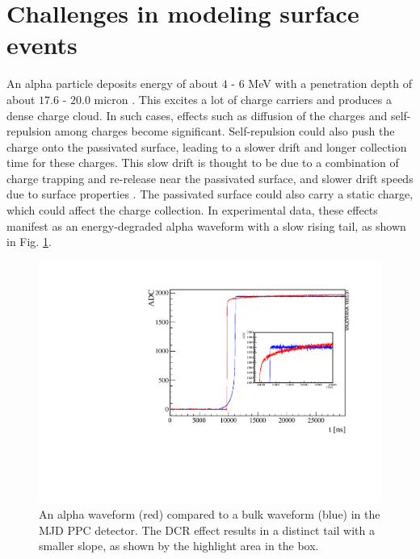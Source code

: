 
\section{Challenges in modeling surface events}
An alpha particle deposits energy of about $4$ - $6$ MeV with a penetration depth of about $17.6$ - $20.0$ micron \cite{knoll_2010}. This excites a lot of charge carriers and produces a dense charge cloud. In such cases, effects such as diffusion of the charges and self-repulsion among charges become significant. Self-repulsion could also push the charge onto the passivated surface, leading to a slower drift and longer collection time for these charges. This slow drift is thought to be due to a combination of charge trapping and re-release near the passivated surface, and slower drift speeds due to surface properties \cite{MULLOWNEY201233}. The passivated surface could also carry a static charge, which could affect the charge collection. In experimental data, these effects manifest as an energy-degraded alpha waveform with a slow rising tail, as shown in Fig. \ref{fig:dcr_waveform}.

  \begin{figure}[!htb]
\centering
  \includegraphics[width=0.8\linewidth]{ch3/figs/dcr_waveform.pdf}
 \caption{An alpha waveform (red) compared to a bulk waveform (blue) in the MJD PPC detector. The DCR effect results in a distinct tail with a smaller slope, as shown by the highlight area in the box.\cite{tube_paper}}
\label{fig:dcr_waveform}
  \end{figure}

